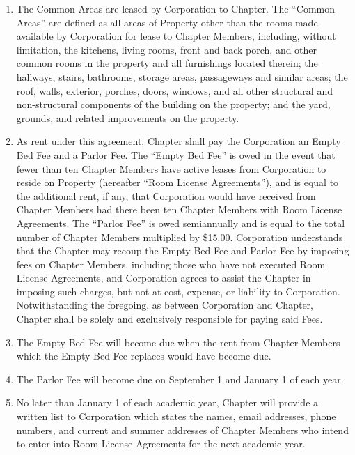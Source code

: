 \documentclass[12pt]{article}
\begin{document}
\begin{enumerate}
        \item The Common Areas are leased by Corporation to Chapter. The ``Common Areas'' are defined as all areas of Property other than the rooms made available by Corporation for lease to Chapter Members, including, without limitation, the kitchens, living rooms, front and back porch, and other common rooms in the property and all furnishings located therein; the hallways, stairs, bathrooms, storage areas, passageways and similar areas; the roof, walls, exterior, porches, doors, windows, and all other structural and non-structural components of the building on the property; and the yard, grounds, and related improvements on the property.

        \item As rent under this agreement, Chapter shall pay the Corporation an Empty Bed Fee and a Parlor Fee.
                The ``Empty Bed Fee'' is owed in the event that fewer than ten Chapter Members have active leases from Corporation to reside on Property (hereafter ``Room License Agreements''), and is equal to the additional rent, if any, that Corporation would have received from Chapter Members had there been ten Chapter Members with Room License Agreements.
                The ``Parlor Fee'' is owed semiannually and is equal to the total number of Chapter Members multiplied by \$15.00.
                Corporation understands that the Chapter may recoup the Empty Bed Fee and Parlor Fee by imposing fees on Chapter Members, including those who have not executed Room License Agreements, and Corporation agrees to assist the Chapter in imposing such charges, but not at  cost, expense, or liability to Corporation.
                Notwithstanding the foregoing, as between Corporation and Chapter, Chapter shall be solely and exclusively responsible for paying said Fees.

        \item The Empty Bed Fee will become due when the rent from Chapter Members which the Empty Bed Fee replaces would have become due.

        \item The Parlor Fee will become due on September 1 and January 1 of each year.

        \item No later than January 1 of each academic year, Chapter will provide a written list to Corporation which states the names, email addresses, phone numbers, and current and summer addresses of Chapter Members who intend to enter into Room License Agreements for the next academic year.


\end{enumerate}
\end{document}
